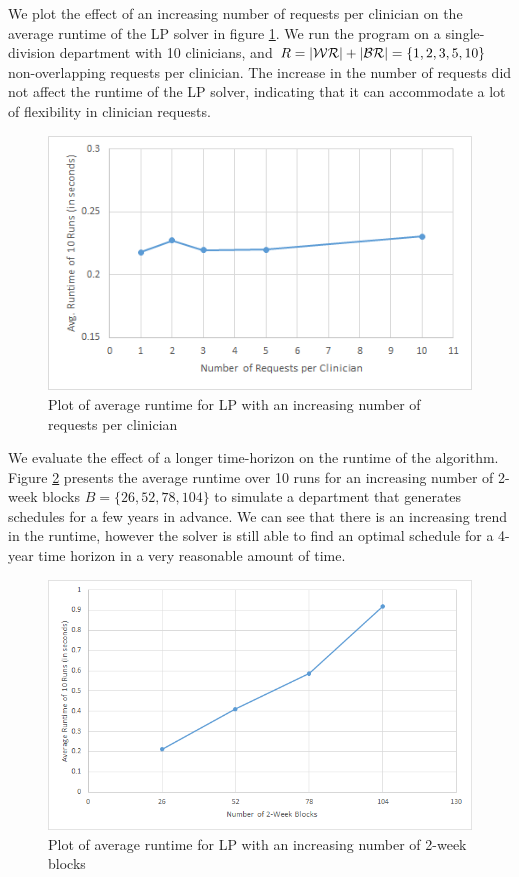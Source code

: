We plot the effect of an increasing number of requests per clinician on the average runtime of the LP solver in figure \ref{fig:avg-runtime-requests}. We run the program on a single-division department with 10 clinicians, and $R = \abs{\mathcal{WR}} + \abs{\mathcal{BR}} = \{1, 2, 3, 5, 10\}$ non-overlapping requests per clinician. The increase in the number of requests did not affect the runtime of the LP solver, indicating that it can accommodate a lot of flexibility in clinician requests. \\

\begin{figure}[h]
	\centering
	\includegraphics[scale=.7]{fig/avg_runtime_requests}
	\caption{Plot of average runtime for LP with an increasing number of requests per clinician}
	\label{fig:avg-runtime-requests}
\end{figure}

We evaluate the effect of a longer time-horizon on the runtime of the algorithm. Figure \ref{fig:avg-runtime-blocks} presents the average runtime over 10 runs for an increasing number of 2-week blocks $B = \{26, 52, 78, 104\}$ to simulate a department that generates schedules for a few years in advance. We can see that there is an increasing trend in the runtime, however the solver is still able to find an optimal schedule for a 4-year time horizon in a very reasonable amount of time.

\begin{figure}[h]
	\centering
	\includegraphics[scale=.7]{fig/avg_runtime_blocks}
	\caption{Plot of average runtime for LP with an increasing number of 2-week blocks}
	\label{fig:avg-runtime-blocks}
\end{figure}
